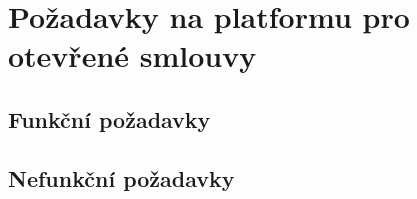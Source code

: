 \chapter{Požadavky na platformu pro otevřené smlouvy}

\section{Funkční požadavky}

\section{Nefunkční požadavky}